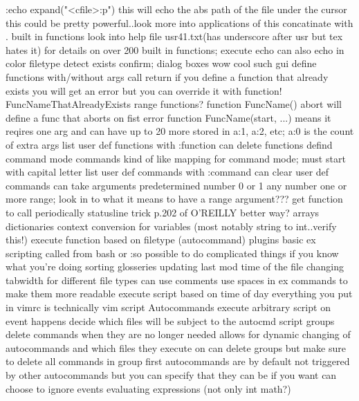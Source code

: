 \documentclass[12pt]{book}
\begin{document}
{{        :echo expand("<cfile>:p")
        this will echo the abs path of the file under the cursor
        this could be pretty powerful..look more into applications of this
    concatinate with .
    built in functions
      look into help file usr41.txt(has underscore after usr but tex hates it) for details on over 200 built in functions;
      execute
      echo
        can also echo in color
      filetype detect
      exists
      confirm; dialog boxes wow cool such gui
    define functions
      with/without args
      call
      return
      if you define a function that already exists you will get an error but you can override it with function! FuncNameThatAlreadyExists
      range functions?
      function FuncName() abort will define a func that aborts on fist error
      function FuncName(start, ...) means it reqires one arg and can have up to 20 more stored in a:1, a:2, etc; a:0 is the count of extra args
      list user def functions with :function
      can delete functions
    defind command mode commands
      kind of like mapping for command mode; must start with capital letter
      list user def commands with :command
      can clear user def commands
      can take arguments
        predetermined number
        0 or 1
        any number
        one or more
        range; look in to what it means to have a range argument???
    get function to call periodically
      statusline trick p.202 of O'REILLY
      better way?
    arrays
    dictionaries
    context conversion for variables (most notably string to int..verify this!)
    execute function based on filetype (autocommand)
    plugins
    basic ex scripting called from bash or :so
      possible to do complicated things if you know what you're doing
        sorting glosseries
        updating last mod time of the file
        changing tabwidth for different file types
      can use comments
      use spaces in ex commands to make them more readable
    execute script based on time of day
    everything you put in vimrc is technically vim script
    Autocommands
      execute arbitrary script on event happens
      decide which files will be subject to the autocmd script
      groups
      delete commands when they are no longer needed
        allows for dynamic changing of autocommands and which files they execute on
      can delete groups but make sure to delete all commands in group first
      autocommands are by default not triggered by other autocommands but you can specify that they can be if you want
      can choose to ignore events
    evaluating expressions (not only int math?)
}}
\end{document}
